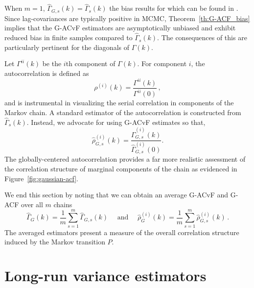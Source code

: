 \documentclass[11pt]{article}
\theoremstyle{remark}
\begin{document}
When $m = 1$, $\hat{\Gamma}_{G,s}(k) = \hat{\Gamma}_{s}(k)
$ the bias results for which can be found in \cite{priestley1981spectral}. Since lag-covariances are typically positive in MCMC, Theorem~\ref{th:G-ACF_bias} implies that the G-ACvF estimators are asymptotically unbiased and exhibit reduced bias in finite samples compared to $\hat{\Gamma}_s(k)$. The consequences of this are particularly pertinent for the diagonals of $\Gamma(k)$.

Let $\Gamma^{ii}(k)$ be the $i${th} component of $\Gamma(k)$. For component $i$, the autocorrelation is defined as
\[
\rho^{(i)}(k) = \dfrac{\Gamma^{ii}(k)}{\Gamma^{ii}(0)}\,,
\]
and is instrumental in visualizing the serial correlation in components of the Markov chain. A standard estimator of the autocorrelation is constructed from $\hat{\Gamma}_s(k)$. Instead, we advocate for using G-ACvF estimates so that,
\begin{equation}
\label{eq:acf}
 \hat{\rho}_{G,s}^{(i)}(k) = \dfrac{ \hat{\Gamma}^{(i)}_{G,s} (k)}{\hat{\Gamma}^{(i)}_{G,s} (0)}. 
\end{equation}
The globally-centered autocorrelation provides a far more realistic assessment of the correlation structure of marginal components of the chain  as evidenced in Figure~\ref{fig:gaussian-acf}.

We end this section by noting that we can obtain an average G-ACvF and G-ACF over all $m$ chains
\[
\hat{\Gamma}_G(k) = \dfrac{1}{m}\sum_{s=1}^m \hat{\Gamma}_{G,s}(k) \quad \text{ and } \quad \hat{\rho}^{(i)}_G(k) = \dfrac{1}{m}\sum_{s=1}^m \hat{\rho}^{(i)}_{G,s}(k)\,.
\]
The averaged estimators present a measure of the overall correlation structure induced by the Markov transition $P$. 

\section{Long-run variance estimators} \label{sec:variance_est}
\end{document}
